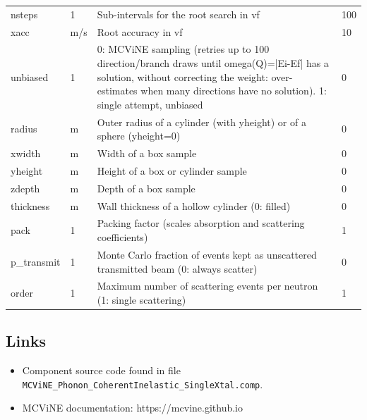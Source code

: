 \begin{longtable}{p{}p{}p{}p{}}
nsteps & 1 & Sub-intervals for the root search in vf & 100 \\
xacc & m/s & Root accuracy in vf & 10 \\
unbiased & 1 & 0: MCViNE sampling (retries up to 100 direction/branch draws until omega(Q)=|Ei-Ef| has a solution, without correcting the weight: over-estimates when many directions have no solution). 1: single attempt, unbiased & 0 \\
radius & m & Outer radius of a cylinder (with yheight) or of a sphere (yheight=0) & 0 \\
xwidth & m & Width of a box sample & 0 \\
yheight & m & Height of a box or cylinder sample & 0 \\
zdepth & m & Depth of a box sample & 0 \\
thickness & m & Wall thickness of a hollow cylinder (0: filled) & 0 \\
pack & 1 & Packing factor (scales absorption and scattering coefficients) & 1 \\
p\_transmit & 1 & Monte Carlo fraction of events kept as unscattered transmitted beam (0: always scatter) & 0 \\
order & 1 & Maximum number of scattering events per neutron (1: single scattering) & 1 \\
\bottomrule
\end{longtable}

\subsection*{Links}
\begin{itemize}
  \item Component source code found in file \texttt{MCViNE\_Phonon\_CoherentInelastic\_SingleXtal.comp}.
  \item MCViNE documentation: https://mcvine.github.io
\end{itemize}
